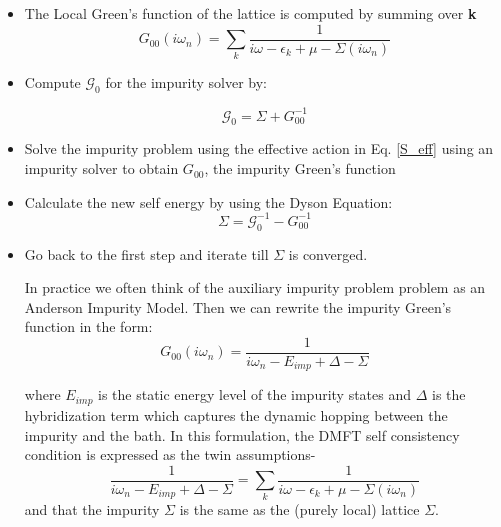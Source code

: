 \documentclass[10pt]{ruthesis}
\begin{document}
\begin{itemize}
\item The Local Green's function of the lattice is computed by summing over \textbf{k}
\begin{equation}
G_{00}(i\omega_n)= \sum_k \dfrac{1}{i\omega -\epsilon_k +\mu -\Sigma(i\omega_n)}
\end{equation}
\item Compute $\mathcal{G}_0$ for the impurity solver by:

\begin{equation}
\mathcal{G}_0=\Sigma + G_{00}^{-1}
\end{equation}

\item Solve the impurity problem using the effective action in Eq. \ref{S_eff} using an impurity solver to obtain $G_{00}$, the  impurity Green's function

\item Calculate the new self energy by using the Dyson Equation:
\begin{equation}
\Sigma= \mathcal{G}_0^{-1} -G_{00}^{-1}
\end{equation}

\item Go back to the first step and iterate till  $\Sigma$ is converged.

In practice we often think of the auxiliary impurity problem problem as an Anderson Impurity Model. Then we can rewrite the impurity Green's function in the form:
\begin{equation}
G_{00}(i \omega_n)= \dfrac{1}{i \omega_n -E_{imp}+ \Delta- \Sigma}
\end{equation}

where $E_{imp}$ is the static energy level of the impurity states and $\Delta$ is the hybridization term which captures the dynamic hopping between the impurity and the bath. In this formulation, the DMFT self consistency condition is expressed as the twin assumptions-
\begin{equation}
\dfrac{1}{i \omega_n -E_{imp}+ \Delta- \Sigma}=  \sum_k \dfrac{1}{i\omega -\epsilon_k +\mu -\Sigma(i\omega_n)}
\end{equation}
and that the impurity  $\Sigma$ is the same as the (purely local) lattice $\Sigma$. 
\end{itemize}
\end{document}
